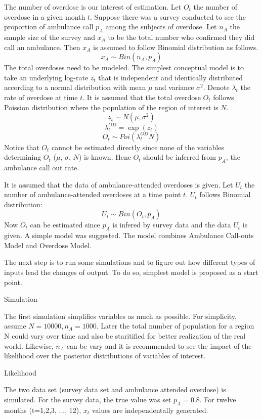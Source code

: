 \documentclass[
10pt, %
a4paper, %
oneside, %
headinclude,footinclude, %
BCOR5mm, %
]{scrartcl}
\begin{document}
\begin{enumerate}
	\normalsize
	The number of overdose is our interest of estimation. Let $O_t$ the number of overdose in a given month $t$. Suppose there was a survey  conducted to see the proportion of ambulance call $p_A$ among the subjects of overdose. Let $n_{A}$ the sample size of the survey and   
	$x_{A}$ to be the total number who confirmed they did call an ambulance. Then $x_{A}$ is assumed to follow Binomial distribution as follows.
	$$x_{A} \sim Bin(n_{A},p_{A})$$
	The total overdoses need to be modeled. The simplest conceptual model is to take an underlying log-rate $z_t$ that is independent and identically distributed according to a normal distribution with mean $\mu$ and variance $\sigma^2$. \cite{Irvine:modelling} Denote $\lambda_{t}$ the rate of overdose at time $t$. It is assumed that the total overdose $O_t$ follows Poission distribution where the population of the region of interest is $N$. 
	$$z_{t} \sim N(\mu, \sigma^{2})$$  
	$$\lambda_{t}^{OD} = \exp(z_{t})$$  
	$$O_{t} \sim Poi(\lambda_{t}^{OD}N)$$  
	\newcommand{\pp}[1]{{#1}_t}
	Notice that $O_t$ cannot be estimated directly since none of the variables determining $O_t$ ($\mu$, $\sigma$, $N$) is known. Henc \(\pp{O}\) should be inferred from \(p_A\), the ambulance call out rate.
	
	It is assumed that the data of ambulance-attended overdoses is given. Let \(U_t\) the number of  ambulance-attended overdoses at a time point $t$. \(U_t\) follows Binomial distribution: 
	$$U_t \sim Bin(O_t, p_A)$$  
	Now $O_t$ can be estimated since $p_A$ is infered by survey data and the data $U_t$ is given. 
	A simple model was suggested. The model combines Ambulance Call-outs Model and Overdose Model. 
	
	The next step is to run some simulations and to figure out how different types of inputs lead the changes of output. To do so, simplest model is proposed as a start point.
	
	\LARGE Simulation
	
	\normalsize The first simulation simplifies variables as much as possible. 
	For simplicity, assume $N= 10000, n_{A}=1000$. Later the total number of population for a region N could vary over time and also be staritified for better realization of the real world. Likewise, $n_A$ can be vary and it is recommended to see the impact of the likelihood over the posterior distributions of variables of interest. 
	
	
	
	\large Likelihood
	
	\normalsize 
	The two data set (survey data set and ambulance attended overdose) is simulated. 
	For the survey data, the true value was set $p_A=0.8$. For twelve months (t=1,2,3, ..., 12), $x_t$ values are independentally generated. 
	

\end{enumerate}
\end{document}
